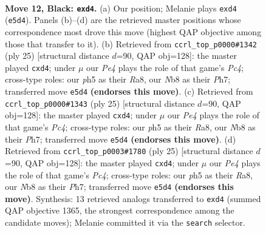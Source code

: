 \documentclass[11pt]{article}
\begin{document}
\clearpage

\begin{figure}[p]\centering
\begin{subfigure}{0.46\textwidth}\centering
\resizebox{\linewidth}{!}{%
\newchessgame
\chessboard[
  setfen={rnbqk2r/pp4bp/6p1/4p2P/3PP1P1/8/P7/R1BQKBNR b KQkq - 0 12},
  showmover=false,
  pgfstyle=straightmove, color=movearrow, markmove={e5-d4}
]}
\caption{}
\end{subfigure}\hfill
\begin{subfigure}{0.46\textwidth}\centering
\resizebox{\linewidth}{!}{%
\newchessgame
\chessboard[
  setfen={r2qk2r/pp2bppp/4b3/2p1P3/3P4/2PBBQ2/P5PP/R3K2R b KQkq - 1 13},
  showmover=false,
  pgfstyle=straightmove, color=movearrow, markmove={c5-d4}
]}
\caption{}
\end{subfigure}
\\[4pt]
\begin{subfigure}{0.46\textwidth}\centering
\resizebox{\linewidth}{!}{%
\newchessgame
\chessboard[
  setfen={r2qk2r/pp2bppp/4b3/2p1P3/3P4/2PBBQ2/P5PP/R3K2R b KQkq - 1 13},
  showmover=false,
  pgfstyle=straightmove, color=movearrow, markmove={c5-d4}
]}
\caption{}
\end{subfigure}\hfill
\begin{subfigure}{0.46\textwidth}\centering
\resizebox{\linewidth}{!}{%
\newchessgame
\chessboard[
  setfen={r2qk2r/pp2bppp/4b3/2p1P3/3P4/2PBBQ2/P5PP/R3K2R b KQkq - 1 13},
  showmover=false,
  pgfstyle=straightmove, color=movearrow, markmove={c5-d4}
]}
\caption{}
\end{subfigure}
\caption{\textbf{Move 12, Black: \texttt{exd4}.} (a) Our position; Melanie plays \texttt{exd4} (\texttt{e5d4}). Panels (b)--(d) are the retrieved master positions whose correspondence most drove this move (highest QAP objective among those that transfer to it). (b) Retrieved from \texttt{ccrl\_top\_p0000\#1342} (ply 25) [structural distance $d$=90, QAP obj=128]: the master played \texttt{cxd4}; under $\mu$ our \emph{Pe4} plays the role of that game's \emph{Pc4}; cross-type roles: our \emph{p}h5 as their \emph{R}a8, our \emph{N}b8 as their \emph{P}h7; transferred move \texttt{e5d4} \textbf{(endorses this move)}. (c) Retrieved from \texttt{ccrl\_top\_p0000\#1343} (ply 25) [structural distance $d$=90, QAP obj=128]: the master played \texttt{cxd4}; under $\mu$ our \emph{Pe4} plays the role of that game's \emph{Pc4}; cross-type roles: our \emph{p}h5 as their \emph{R}a8, our \emph{N}b8 as their \emph{P}h7; transferred move \texttt{e5d4} \textbf{(endorses this move)}. (d) Retrieved from \texttt{ccrl\_top\_p0003\#1780} (ply 25) [structural distance $d$=90, QAP obj=128]: the master played \texttt{cxd4}; under $\mu$ our \emph{Pe4} plays the role of that game's \emph{Pc4}; cross-type roles: our \emph{p}h5 as their \emph{R}a8, our \emph{N}b8 as their \emph{P}h7; transferred move \texttt{e5d4} \textbf{(endorses this move)}. Synthesis: 13 retrieved analogs transferred to \texttt{exd4} (summed QAP objective 1365, the strongest correspondence among the candidate moves); Melanie committed it via the \texttt{search} selector.}
\label{fig:thought-m23}
\end{figure}
\end{document}
